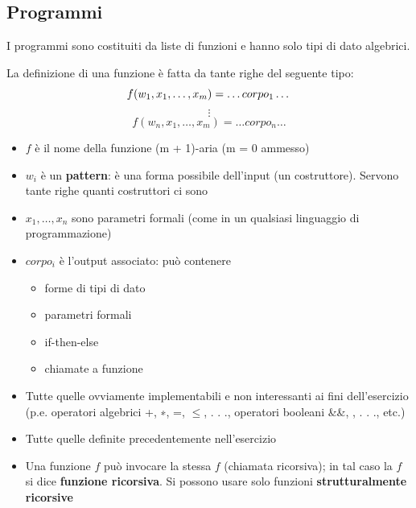 \documentclass[
  a4paper,
]{article}
\providecommand{\tightlist}{%
  \setlength{\itemsep}{0pt}\setlength{\parskip}{0pt}}
\begin{document}
\hypertarget{programmi}{%
\subsection{Programmi}\label{programmi}}

I programmi sono costituiti da liste di funzioni e hanno solo tipi di
dato algebrici.

La definizione di una funzione è fatta da tante righe del seguente tipo:
\[
f(w_1, x_1, \dots,  x_m) = \dots corpo_1 \dots \\
\] \[
\vdots 
\] \[
f(w_n, x_1, \dots,  x_m) = \dots corpo_n \dots
\]

\begin{itemize}
\item
  \(f\) è il nome della funzione (m + 1)-aria (m = 0 ammesso)
\item
  \(w_i\) è un \textbf{pattern}: è una forma possibile dell'input (un
  costruttore). Servono tante righe quanti costruttori ci sono
\item
  \(x_1, \dots , x_n\) sono parametri formali (come in un qualsiasi
  linguaggio di programmazione)
\item
  \(corpo_i\) è l'output associato: può contenere

  \begin{itemize}
  \tightlist
  \item
    forme di tipi di dato
  \item
    parametri formali
  \item
    if-then-else
  \item
    chiamate a funzione
  \end{itemize}
\end{itemize}

\begin{examplebox}

\begin{itemize}
\tightlist
\item
  Tutte quelle ovviamente implementabili e non interessanti ai fini
  dell'esercizio (p.e. operatori algebrici +, ∗, =, \(\leq\), . . .,
  operatori booleani \&\&, \textbar\textbar, . . ., etc.)
\item
  Tutte quelle definite precedentemente nell'esercizio
\item
  Una funzione \(f\) può invocare la stessa \(f\) (chiamata ricorsiva);
  in tal caso la \(f\) si dice \textbf{funzione ricorsiva}. Si possono
  usare solo funzioni \textbf{strutturalmente ricorsive}
\end{itemize}

\end{examplebox}
\end{document}

